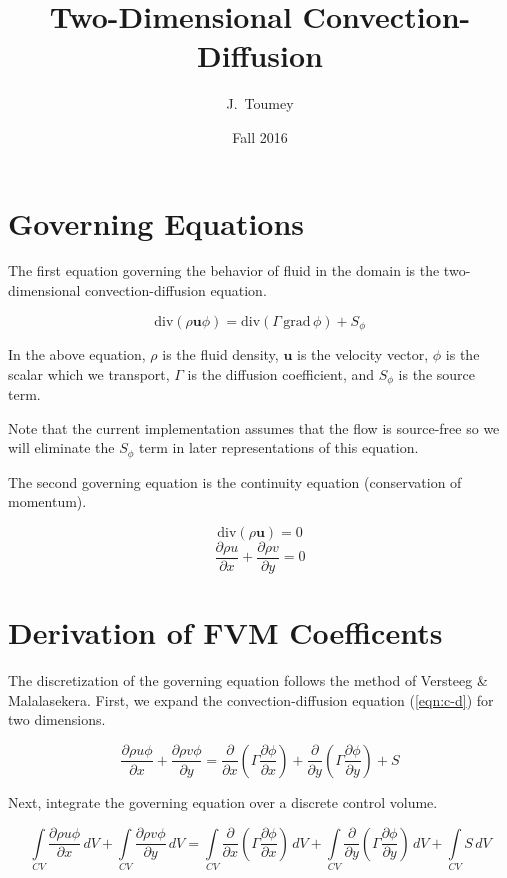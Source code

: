 \documentclass{article}
\title{Two-Dimensional Convection-Diffusion}
\author{J.\ Toumey}
\date{Fall 2016}
\newcommand{\dby}[2]{\frac{\partial #1}{\partial #2}}
\newcommand{\intb}[1]{\int\limits_{#1}}
\newcommand{\lp}{\left(}
\newcommand{\rp}{\right)}
\newcommand{\divc}[1]{\mathrm{div}\!\left(#1\right)}
\begin{document}
\maketitle


\section{Governing Equations}
The first equation governing the behavior of fluid in the domain is the two-dimensional convection-diffusion equation.

\begin{equation}
   \divc{\rho \mathbf{u} \phi} = \divc{\Gamma \, \mathrm{grad}\, \phi} + S_{\phi}
   \label{eqn:c-d}
\end{equation}

In the above equation, $\rho$ is the fluid density, $\mathbf{u}$ is the velocity vector, $\phi$ is the scalar which we transport, $\Gamma$ is the diffusion coefficient, and $S_{\phi}$ is the source term.

Note that the current implementation assumes that the flow is source-free so we will eliminate the $S_{\phi}$ term in later representations of this equation.


The second governing equation is the continuity equation (conservation of momentum).

\begin{equation}
   \divc{\rho \mathbf{u}} = 0
\end{equation}
\begin{equation}
   \dby{\rho u}{x} + \dby{\rho v}{y} = 0
\end{equation}

\section{Derivation of FVM Coefficents}
The discretization of the governing equation follows the method of Versteeg \& Malalasekera. First, we expand the convection-diffusion equation (\ref{eqn:c-d}) for two dimensions.

\begin{equation}
   \dby{\rho u \phi}{x} + \dby{\rho v \phi}{y} = \dby{}{x} \lp \Gamma \dby{\phi}{x} \rp + \dby{}{y} \lp \Gamma \dby{\phi}{y} \rp + S
\end{equation}

Next, integrate the governing equation over a discrete control volume.

\begin{equation}
   \intb{CV} \dby{\rho u \phi}{x}\,dV + \intb{CV} \dby{\rho v \phi}{y}\,dV =\intb{CV} \dby{}{x} \lp \Gamma \dby{\phi}{x} \rp\,dV + \intb{CV} \dby{}{y} \lp \Gamma \dby{\phi}{y} \rp\,dV + \intb{CV} S\,dV
\end{equation}
\end{document}
